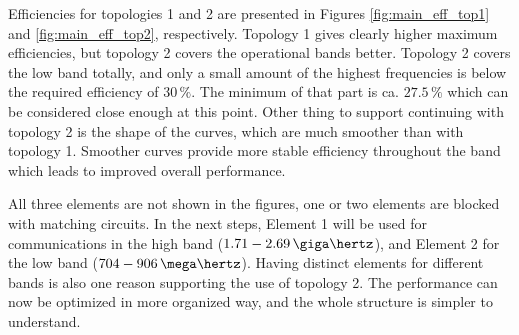Efficiencies for topologies 1 and 2 are presented in Figures \ref{fig:main_eff_top1} and \ref{fig:main_eff_top2}, respectively. Topology 1 gives clearly higher maximum efficiencies, but topology 2 covers the operational bands better. Topology 2 covers the low band totally, and only a small amount of the highest frequencies is below the required efficiency of $30\,\%$. The minimum of that part is ca. $27.5\,\%$ which can be considered close enough at this point. Other thing to support continuing with topology 2 is the shape of the curves, which are much smoother than with topology 1. Smoother curves provide more stable efficiency throughout the band which leads to improved overall performance.

All three elements are not shown in the figures, one or two elements are blocked with matching circuits. In the next steps, Element 1 will be used for communications in the high band ($1.71-2.69\,\giga\hertz$), and Element 2 for the low band ($704-906\,\mega\hertz$). Having distinct elements for different bands is also one reason supporting the use of topology 2. The performance can now be optimized in more organized way, and the whole structure is simpler to understand.

